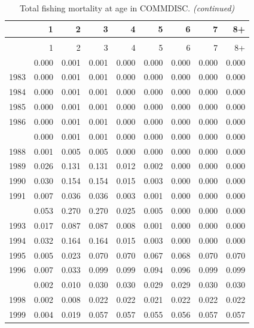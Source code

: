 \documentclass[
]{article}
\begin{document}
\begin{longtable}[t]{lrrrrrrrr}
\caption{\label{tab:COMMDISC-fleet-FAA-table}Total fishing mortality at age in COMMDISC.}\\
\toprule
  & 1 & 2 & 3 & 4 & 5 & 6 & 7 & 8+\\
\midrule
\endfirsthead
\caption[]{Total fishing mortality at age in COMMDISC. \textit{(continued)}}\\
\toprule
  & 1 & 2 & 3 & 4 & 5 & 6 & 7 & 8+\\
\midrule
\endhead

\endfoot
\bottomrule
\endlastfoot
1982 & 0.000 & 0.001 & 0.001 & 0.000 & 0.000 & 0.000 & 0.000 & 0.000\\
1983 & 0.000 & 0.001 & 0.001 & 0.000 & 0.000 & 0.000 & 0.000 & 0.000\\
1984 & 0.000 & 0.001 & 0.001 & 0.000 & 0.000 & 0.000 & 0.000 & 0.000\\
1985 & 0.000 & 0.001 & 0.001 & 0.000 & 0.000 & 0.000 & 0.000 & 0.000\\
1986 & 0.000 & 0.001 & 0.001 & 0.000 & 0.000 & 0.000 & 0.000 & 0.000\\
\addlinespace
1987 & 0.000 & 0.001 & 0.001 & 0.000 & 0.000 & 0.000 & 0.000 & 0.000\\
1988 & 0.001 & 0.005 & 0.005 & 0.000 & 0.000 & 0.000 & 0.000 & 0.000\\
1989 & 0.026 & 0.131 & 0.131 & 0.012 & 0.002 & 0.000 & 0.000 & 0.000\\
1990 & 0.030 & 0.154 & 0.154 & 0.015 & 0.003 & 0.000 & 0.000 & 0.000\\
1991 & 0.007 & 0.036 & 0.036 & 0.003 & 0.001 & 0.000 & 0.000 & 0.000\\
\addlinespace
1992 & 0.053 & 0.270 & 0.270 & 0.025 & 0.005 & 0.000 & 0.000 & 0.000\\
1993 & 0.017 & 0.087 & 0.087 & 0.008 & 0.001 & 0.000 & 0.000 & 0.000\\
1994 & 0.032 & 0.164 & 0.164 & 0.015 & 0.003 & 0.000 & 0.000 & 0.000\\
1995 & 0.005 & 0.023 & 0.070 & 0.070 & 0.067 & 0.068 & 0.070 & 0.070\\
1996 & 0.007 & 0.033 & 0.099 & 0.099 & 0.094 & 0.096 & 0.099 & 0.099\\
\addlinespace
1997 & 0.002 & 0.010 & 0.030 & 0.030 & 0.029 & 0.029 & 0.030 & 0.030\\
1998 & 0.002 & 0.008 & 0.022 & 0.022 & 0.021 & 0.022 & 0.022 & 0.022\\
1999 & 0.004 & 0.019 & 0.057 & 0.057 & 0.055 & 0.056 & 0.057 & 0.057\\

\end{longtable}
\end{document}
